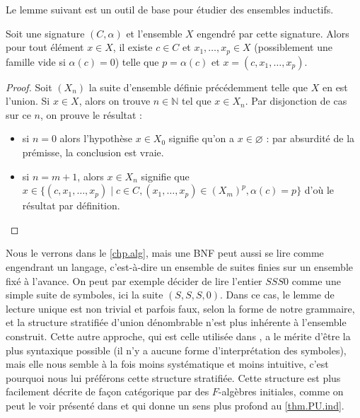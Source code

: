 Le lemme suivant est un outil de base pour étudier des ensembles inductifs.

\begin{lemma}
  Soit une signature $(C,\alpha)$ et l'ensemble $X$ engendré par cette
  signature. Alors pour tout élément $x \in X$, il existe $c\in C$ et
  $x_1,\ldots,x_p \in X$ (possiblement une famille vide si $\alpha(c) = 0$)
  telle que $p = \alpha(c)$ et $x = (c,x_1,\ldots,x_p)$.
\end{lemma}

\begin{proof}
  Soit $(X_n)$ la suite d'ensemble définie précédemment telle que $X$ en est
  l'union. Si $x\in X$, alors on trouve $n \in \mathbb N$ tel que $x\in X_n$.
  Par disjonction de cas sur ce $n$, on prouve le résultat :
  \begin{itemize}
  \item si $n = 0$ alors l'hypothèse $x \in X_0$ signifie qu'on a
    $x\in \varnothing$ : par absurdité de la prémisse, la conclusion est vraie.
  \item si $n = m+1$, alors $x\in X_n$ signifie que
    $x \in \{(c,x_1,\ldots,x_p)\mid c\in C, (x_1,\ldots,x_p)\in(X_m)^p,
    \alpha(c) = p\}$ d'où le résultat par définition.
  \end{itemize}
\end{proof}

\begin{remark}
  Nous le verrons dans le \cref{chp.alg}, mais une BNF peut aussi se lire comme
  engendrant un langage, c'est-à-dire un ensemble de suites finies sur un
  ensemble fixé à l'avance. On peut par exemple décider de lire l'entier $SSS0$
  comme une simple suite de symboles, ici la suite $(S,S,S,0)$. Dans ce cas, le
  lemme de lecture unique est non trivial et parfois faux, selon la forme de
  notre grammaire, et la structure stratifiée d'union dénombrable n'est plus
  inhérente à l'ensemble construit. Cette autre approche, qui est celle utilisée
  dans \cite{cori2003logique}, a le mérite d'être la plus syntaxique possible
  (il n'y a aucune forme d'interprétation des symboles), mais elle nous semble à
  la fois moins systématique et moins intuitive, c'est pourquoi nous lui
  préférons cette structure stratifiée. Cette structure est plus facilement
  décrite de façon catégorique par des $F$-algèbres initiales, comme on peut le
  voir présenté dans \cite{JacobsCLTT} et qui donne un sens plus profond au
  \cref{thm.PU.ind}.
\end{remark}

